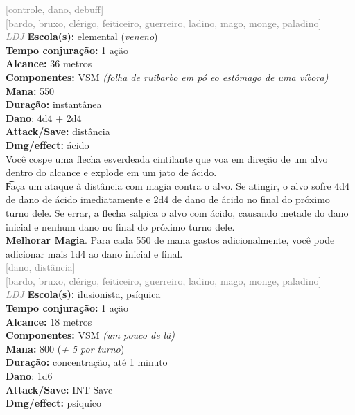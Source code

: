 \documentclass{RPG_Adventure}[2021/10/20]
\begin{document}
{\scriptsize \textcolor{gray}{[controle, dano, debuff]\\}}
{\scriptsize \textcolor{gray}{[bardo, bruxo, clérigo, feiticeiro, guerreiro, ladino, mago, monge, paladino]\\}}
{\tiny \textcolor{gray}{\textit{LDJ}}}
{\small \t \textbf{Escola(s):} elemental (\textit{veneno})\\\t \textbf{Tempo conjuração:} 1 ação\\\t \textbf{Alcance:} 36 metros\\\t \textbf{Componentes:} VSM \textit{(folha de ruibarbo em pó eo estômago de uma víbora)}\\\t \textbf{Mana:} 550\\\t \textbf{Duração:} instantânea\\\t \textbf{Dano}: 4d4 + 2d4\\\t \textbf{Attack/Save:} distância\\\t \textbf{Dmg/effect:} ácido\\}
{\normalsize Você cospe uma flecha esverdeada cintilante que voa em direção de um alvo dentro do alcance e explode em um jato de ácido.\\\t Faça um ataque à distância com magia contra o alvo. Se atingir, o alvo sofre 4d4 de dano de ácido imediatamente e 2d4 de dano de ácido no final do próximo turno dele. Se errar, a flecha salpica o alvo com ácido, causando metade do dano inicial e nenhum dano no final do próximo turno dele.\\\t \textbf{Melhorar Magia}. Para cada 550 de mana gastos adicionalmente, você pode adicionar mais 1d4 ao dano inicial e final.\\}
{\scriptsize \textcolor{gray}{[dano, distância]\\}}
{\scriptsize \textcolor{gray}{[bardo, bruxo, clérigo, feiticeiro, guerreiro, ladino, mago, monge, paladino]\\}}
{\tiny \textcolor{gray}{\textit{LDJ}}}
{\small \t \textbf{Escola(s):} ilusionista, psíquica\\\t \textbf{Tempo conjuração:} 1 ação\\\t \textbf{Alcance:} 18 metros\\\t \textbf{Componentes:} VSM \textit{(um pouco de lã)}\\\t \textbf{Mana:} 800 (\textit{+ 5 por turno})\\\t \textbf{Duração:} concentração, até 1 minuto\\\t \textbf{Dano}: 1d6\\\t \textbf{Attack/Save:} INT Save\\\t \textbf{Dmg/effect:} psíquico\\}
\end{document}
